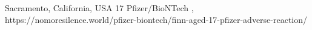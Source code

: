           {Sacramento, California, USA}
          {17}
          {Pfizer/BioNTech}
          {, }
          {
          }
          {https://nomoresilence.world/pfizer-biontech/finn-aged-17-pfizer-adverse-reaction/}

